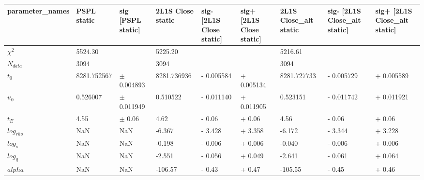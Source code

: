 \begin{tabular}{lllllllll}
\toprule
parameter_names & PSPL static & sig [PSPL static] & 2L1S Close static & sig- [2L1S Close static] & sig+ [2L1S Close static] & 2L1S Close_alt static & sig- [2L1S Close_alt static] & sig+ [2L1S Close_alt static] \\
\midrule
       $\chi^2$ &     5524.30 &                   &           5225.20 &                          &                          &               5216.61 &                              &                              \\
     $N_{data}$ &        3094 &                   &              3094 &                          &                          &                  3094 &                              &                              \\
        $t_{0}$ & 8281.752567 &    $\pm$ 0.004893 &       8281.736936 &               - 0.005584 &               + 0.005134 &           8281.727733 &                   - 0.005729 &                   + 0.005589 \\
        $u_{0}$ &    0.526007 &    $\pm$ 0.011949 &          0.510522 &               - 0.011140 &               + 0.011905 &              0.523151 &                   - 0.011742 &                   + 0.011921 \\
        $t_{E}$ &        4.55 &        $\pm$ 0.06 &              4.62 &                   - 0.06 &                   + 0.06 &                  4.56 &                       - 0.06 &                       + 0.06 \\
    $log_{rho}$ &         NaN &               NaN &            -6.367 &                  - 3.428 &                  + 3.358 &                -6.172 &                      - 3.344 &                      + 3.228 \\
      $log_{s}$ &         NaN &               NaN &            -0.198 &                  - 0.006 &                  + 0.006 &                -0.040 &                      - 0.006 &                      + 0.006 \\
      $log_{q}$ &         NaN &               NaN &            -2.551 &                  - 0.056 &                  + 0.049 &                -2.641 &                      - 0.061 &                      + 0.064 \\
        $alpha$ &         NaN &               NaN &           -106.57 &                   - 0.43 &                   + 0.47 &               -105.55 &                       - 0.45 &                       + 0.46 \\

\end{tabular}
